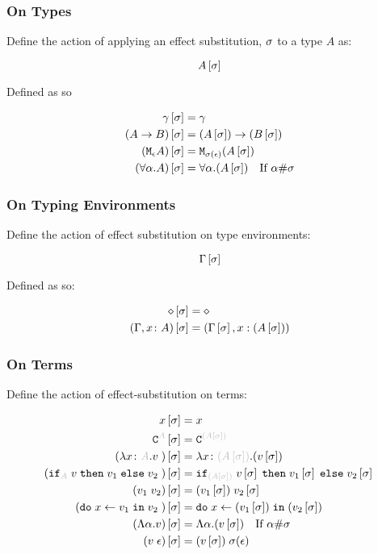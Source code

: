 \documentclass{report}
\begin{document}
        \subsubsection{On Types}
            
            Define the action of applying an effect substitution, $\sigma$ to a type $A$ as:

            $$A\left[\sigma\right]$$

            Defined as so

            \begin{align*}
                \gamma\left[\sigma\right] &= \gamma \\
                (A\rightarrow B)\left[\sigma\right] &= (A\left[\sigma\right])\rightarrow (B\left[\sigma\right]) \\
                (\texttt{M}_{\epsilon}{A})\left[\sigma\right] &= \texttt{M}_{\sigma(\epsilon)}{(A\left[\sigma\right])}\\
                (\forall \alpha. A)\left[\sigma\right] &= \forall \alpha. (A\left[\sigma\right])\quad\text{If $\alpha\#\sigma$}
            \end{align*}

        \subsubsection{On Typing Environments}
            

            Define the action of effect substitution on type environments:
                    
            $$\Gamma\left[\sigma\right]$$
                    
            Defined as so:
                    
            \begin{align*}
                \diamond\left[\sigma\right] & = \diamond \\
                (\Gamma, x\colon A)\left[\sigma\right] &= (\Gamma\left[\sigma\right], x:(A\left[\sigma\right]))\\
            \end{align*}

        \subsubsection{On Terms}
            Define the action of effect-substitution on terms:

            \begin{align*}
                x\ssi & = x \\
                \const{A}\ssi & = \const{(A\ssi)} \\
                (\lam{x}{A}{v})\ssi &= \lam{x}{(A\ssi)}{(v\ssi)}\\
                (\pifthenelse{A}{v}{v_1}{v_2})\ssi &= \pifthenelse{(A\ssi)}{v\ssi}{v_1\ssi}{v_2\ssi}\\
                (\apply{v_1}{v_2})\ssi&= \apply{(v_1\ssi)}{v_2\ssi}\\
                (\doin{x}{v_1}{v_2})\ssi&= \doin{x}{(v_1\ssi)}{(v_2\ssi)}\\
                (\elam{\a}{v})\ssi & = \elam{\a}{(v\ssi)}\qt{If $\a\#\si$}\\
                (\eapp{v}{\e})\ssi & = \eapp{(v\ssi)}{\si(\e)}\\
            \end{align*}
\end{document}
